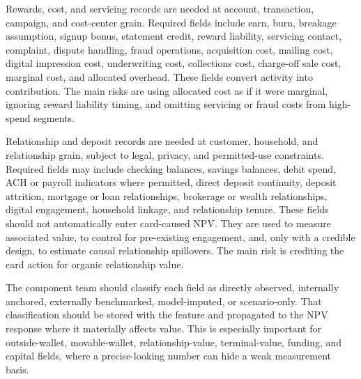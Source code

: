 \documentclass[11pt]{article}
\newcommand{\1}{\mathbf{1}}
\begin{document}
Rewards, cost, and servicing records are needed at account, transaction,
campaign, and cost-center grain. Required fields include earn, burn, breakage
assumption, signup bonus, statement credit, reward liability, servicing
contact, complaint, dispute handling, fraud operations, acquisition cost,
mailing cost, digital impression cost, underwriting cost, collections cost,
charge-off sale cost, marginal cost, and allocated overhead. These fields
convert activity into contribution. The main risks are using allocated cost as
if it were marginal, ignoring reward liability timing, and omitting servicing
or fraud costs from high-spend segments.

Relationship and deposit records are needed at customer, household, and
relationship grain, subject to legal, privacy, and permitted-use constraints.
Required fields may include checking balances, savings balances, debit spend,
ACH or payroll indicators where permitted, direct deposit continuity,
deposit attrition, mortgage or loan relationships, brokerage or wealth
relationships, digital engagement, household linkage, and relationship tenure.
These fields should not automatically enter card-caused NPV. They are used to
measure associated value, to control for pre-existing engagement, and, only
with a credible design, to estimate causal relationship spillovers. The main
risk is crediting the card action for organic relationship value.

The component team should classify each field as directly observed,
internally anchored, externally benchmarked, model-imputed, or scenario-only.
That classification should be stored with the feature and propagated to the
NPV response where it materially affects value. This is especially important
for outside-wallet, movable-wallet, relationship-value, terminal-value,
funding, and capital fields, where a precise-looking number can hide a weak
measurement basis.
\end{document}
